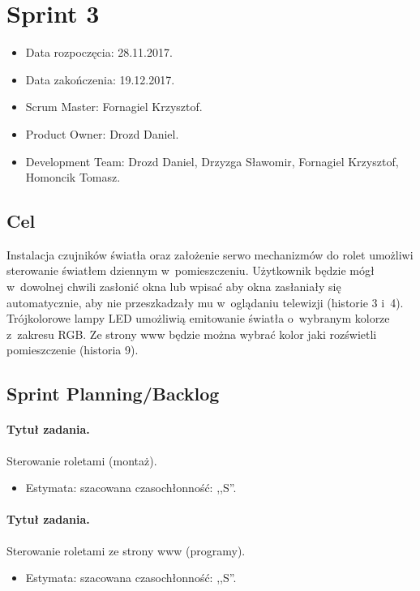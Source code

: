 \section{Sprint 3}
\begin{itemize}
	\item Data rozpoczęcia: 28.11.2017.
	\item Data zakończenia: 19.12.2017.
	\item Scrum Master: Fornagiel Krzysztof.
	\item Product Owner: Drozd Daniel.
	\item Development Team: Drozd Daniel, Drzyzga Sławomir, Fornagiel Krzysztof, Homoncik Tomasz.
\end{itemize}
\subsection{Cel} 


Instalacja czujników światła oraz założenie serwo mechanizmów do rolet umożliwi sterowanie światłem dziennym w~pomieszczeniu. Użytkownik będzie mógł w~dowolnej chwili zasłonić okna lub wpisać aby okna zasłaniały się automatycznie, aby nie przeszkadzały mu w~oglądaniu telewizji (historie 3 i~4). Trójkolorowe lampy LED umożliwią emitowanie światła o~wybranym kolorze z~zakresu RGB. Ze strony www będzie można wybrać kolor jaki rozświetli pomieszczenie (historia 9).



\subsection{Sprint Planning/Backlog}

\paragraph{Tytuł zadania.} Sterowanie roletami (montaż).
\begin{itemize}
	\item Estymata: szacowana czasochłonność: ,,S''.
\end{itemize}

\paragraph{Tytuł zadania.} Sterowanie roletami ze strony www (programy).
\begin{itemize}
	\item Estymata: szacowana czasochłonność: ,,S''.
\end{itemize}

